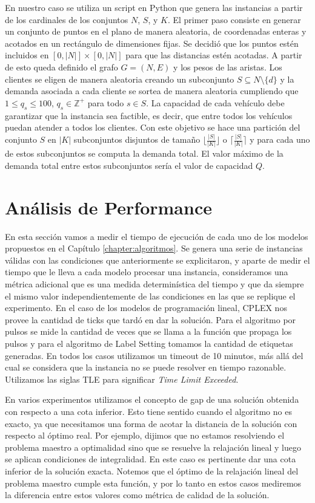 En nuestro caso se utiliza un script en Python que genera las instancias a partir de los cardinales de los conjuntos $N$, $S$, y $K$. El primer paso consiste en generar un conjunto de puntos en el plano de manera aleatoria, de coordenadas enteras y acotados en un rectángulo de dimensiones fijas. Se decidió que los puntos estén incluidos en $[0, |N|] \times [0, |N|]$ para que las distancias estén acotadas. A partir de esto queda definido el grafo $G = (N, E)$ y los pesos de las aristas. Los clientes se eligen de manera aleatoria creando un subconjunto $S \subseteq N \setminus \{d\}$ y la demanda asociada a cada cliente se sortea de manera aleatoria cumpliendo que $1 \leq q_s \leq 100$, $q_s \in \mathbb{Z}^{+}$ para todo $s \in S$. La capacidad de cada vehículo debe garantizar que la instancia sea factible, es decir, que entre todos los vehículos puedan atender a todos los clientes. Con este objetivo se hace una partición del conjunto $S$ en $|K|$ subconjuntos disjuntos de tamaño $\lfloor \frac{|S|}{|K|} \rfloor$ o $\lceil \frac{|S|}{|K|} \rceil$ y para cada uno de estos subconjuntos se computa la demanda total. El valor máximo de la demanda total entre estos subconjuntos sería el valor de capacidad $Q$.

\section{Análisis de Performance}
\label{section:performance}

En esta sección vamos a medir el tiempo de ejecución de cada uno de los modelos propuestos en el Capítulo \ref{chapter:algoritmos}. Se genera una serie de instancias válidas con las condiciones que anteriormente se explicitaron, y aparte de medir el tiempo que le lleva a cada modelo procesar una instancia, consideramos una métrica adicional que es una medida determinística del tiempo y que da siempre el mismo valor independientemente de las condiciones en las que se replique el experimento. En el caso de los modelos de programación lineal, CPLEX nos provee la cantidad de ticks que tardó en dar la solución. Para el algoritmo por pulsos se mide la cantidad de veces que se llama a la función que propaga los pulsos y para el algoritmo de Label Setting tomamos la cantidad de etiquetas generadas. En todos los casos utilizamos un timeout de 10 minutos, más allá del cual se considera que la instancia no se puede resolver en tiempo razonable. Utilizamos las siglas TLE para significar \textit{Time Limit Exceeded}. 

En varios experimentos utilizamos el concepto de gap de una solución obtenida con respecto a una cota inferior. Esto tiene sentido cuando el algoritmo no es exacto, ya que necesitamos una forma de acotar la distancia de la solución con respecto al óptimo real. Por ejemplo, dijimos que no estamos resolviendo el problema maestro a optimalidad sino que se resuelve la relajación lineal y luego se aplican condiciones de integralidad. En este caso es pertinente dar una cota inferior de la solución exacta. Notemos que el óptimo de la relajación lineal del problema maestro cumple esta función, y por lo tanto en estos casos mediremos la diferencia entre estos valores como métrica de calidad de la solución.  


